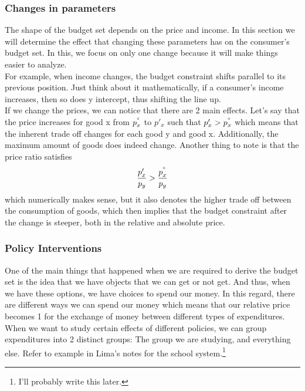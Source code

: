 \documentclass{article}
\begin{document}
\subsubsection{Changes in parameters}
The shape of the budget set depends on the price and income. In this section we will determine the effect that changing these parameters has on the consumer's budget set. In this, we focus on only one change because it will make things easier to analyze. \\


For example, when income changes, the budget constraint shifts parallel to its previous position. Just think about it mathematically, if a consumer's income increases, then so does y intercept, thus shifting the line up. \\


If we change the prices, we can notice that there are 2 main effects. Let's say that the price increases for good x from $p^{\degree}_{x}$ to $p'_x$ such that $p'_x > p^{\degree}_{x} $ which means that the inherent trade off changes for each good y and good x. Additionally, the maximum amount of goods does indeed change. Another thing to note is that the price ratio satisfies
\[
\frac{p'_x}{p_y} > \frac{p^{\degree}_{x}}{p_y}
\]
which numerically makes sense, but it also denotes the higher trade off between the consumption of goods, which then implies that the budget constraint after the change is steeper, both in the relative and absolute price. 
\subsubsection{Policy Interventions}
One of the main things that happened when we are required to derive the budget set is the idea that we have objects that we can get or not get. And thus, when we have these options, we have choices to spend our money. In this regard, there are different ways we can spend our money which means that our relative price becomes 1 for the exchange of money between different types of expenditures. \\


When we want to study certain effects of different policies, we can group expenditures into 2 distinct groups: The group we are studying, and everything else. Refer to example in Lima's notes for the school system.\footnote{I'll probably write this later.}
\end{document}
